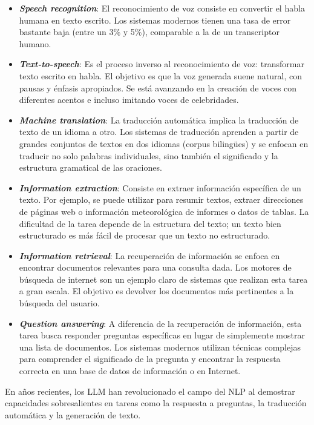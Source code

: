 \begin{itemize}
    \item \textbf{\textit{Speech recognition}}: El reconocimiento de voz consiste en convertir 
    el habla humana en texto escrito. Los sistemas modernos tienen una tasa de error 
    bastante baja (entre un 3\% y 5\%), comparable a la de un transcriptor humano.
    \item \textbf{\textit{Text-to-speech}}: Es el proceso inverso al reconocimiento de voz: 
    transformar texto escrito en habla. El objetivo es que la voz generada suene natural, 
    con pausas y énfasis apropiados. Se está avanzando en la creación de voces con 
    diferentes acentos e incluso imitando voces de celebridades.
    \item \textbf{\textit{Machine translation}}: La traducción automática implica la traducción 
    de texto de un idioma a otro. Los sistemas de traducción aprenden a partir de grandes 
    conjuntos de textos en dos idiomas (corpus bilingües) y se enfocan en traducir no 
    solo palabras individuales, sino también el significado y la estructura gramatical 
    de las oraciones.
    \item \textbf{\textit{Information extraction}}: Consiste en extraer información específica 
    de un texto. Por ejemplo, se puede utilizar para resumir textos, extraer direcciones 
    de páginas web o información meteorológica de informes o datos de tablas. 
    La dificultad de la tarea depende de la estructura del texto; un texto bien 
    estructurado es más fácil de procesar que un texto no estructurado.
    \item \textbf{\textit{Information retrieval}}: La recuperación de información se enfoca 
    en encontrar documentos relevantes para una consulta dada. Los motores de búsqueda 
    de internet son un ejemplo claro de sistemas que realizan esta tarea a gran escala. 
    El objetivo es devolver los documentos más pertinentes a la búsqueda del usuario.
    \item \textbf{\textit{Question answering}}: A diferencia de la recuperación de información, 
    esta tarea busca responder preguntas específicas en lugar de simplemente mostrar 
    una lista de documentos. Los sistemas modernos utilizan técnicas complejas para 
    comprender el significado de la pregunta y encontrar la respuesta correcta en 
    una base de datos de información o en Internet.
\end{itemize}

En años recientes, los LLM han revolucionado el campo del NLP al demostrar capacidades 
sobresalientes en tareas como la respuesta a preguntas, la traducción automática y 
la generación de texto.

